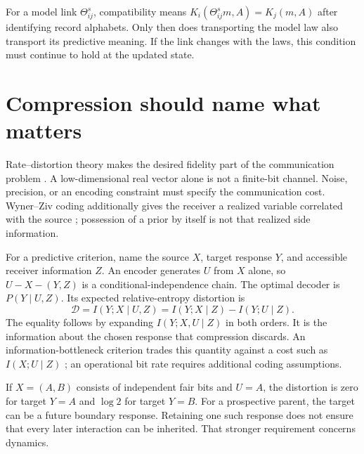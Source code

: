 For a model link $\Theta^s_{ij}$, compatibility means $K_i(\Theta^s_{ij}m,A)=K_j(m,A)$ after identifying record alphabets. Only then does transporting the model law also transport its predictive meaning. If the link changes with the laws, this condition must continue to hold at the updated state.

\section{Compression should name what matters}

Rate--distortion theory makes the desired fidelity part of the communication problem \citep{Shannon1959}. A low-dimensional real vector alone is not a finite-bit channel. Noise, precision, or an encoding constraint must specify the communication cost. Wyner--Ziv coding additionally gives the receiver a realized variable correlated with the source \citep{WynerZiv1976}; possession of a prior by itself is not that realized side information.

For a predictive criterion, name the source $X$, target response $Y$, and accessible receiver information $Z$. An encoder generates $U$ from $X$ alone, so $U-X-(Y,Z)$ is a conditional-independence chain. The optimal decoder is $P(Y\mid U,Z)$. Its expected relative-entropy distortion is
\begin{equation}
\mathcal D=I(Y;X\mid U,Z)
=I(Y;X\mid Z)-I(Y;U\mid Z).
\label{comp:eq-predictive-distortion}
\end{equation}
The equality follows by expanding $I(Y;X,U\mid Z)$ in both orders. It is the information about the chosen response that compression discards. An information-bottleneck criterion trades this quantity against a cost such as $I(X;U\mid Z)$ \citep{Tishby1999}; an operational bit rate requires additional coding assumptions.

If $X=(A,B)$ consists of independent fair bits and $U=A$, the distortion is zero for target $Y=A$ and $\log2$ for target $Y=B$. For a prospective parent, the target can be a future boundary response. Retaining one such response does not ensure that every later interaction can be inherited. That stronger requirement concerns dynamics.
